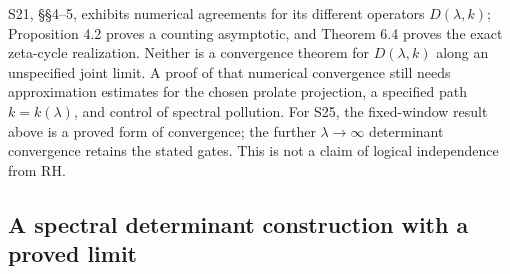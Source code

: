 S21, \S\S4--5, exhibits numerical agreements for its different
operators \(D(\lambda,k)\); Proposition 4.2 proves a counting
asymptotic, and Theorem 6.4 proves the exact zeta-cycle realization.
Neither is a convergence theorem for \(D(\lambda,k)\) along an
unspecified joint limit.  A proof of that numerical convergence still
needs approximation estimates for the chosen prolate projection,
a specified path \(k=k(\lambda)\), and control of spectral pollution.
For S25, the fixed-window result above is a proved form of convergence;
the further \(\lambda\to\infty\) determinant convergence retains
the stated gates.  This is not a claim of logical independence from RH.
\subsection{A spectral determinant construction with a proved limit}

